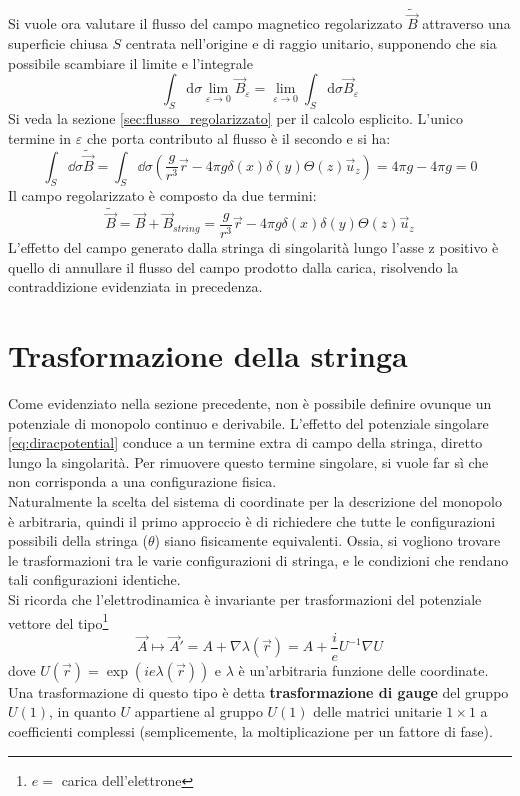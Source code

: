 Si vuole ora valutare il flusso del campo magnetico regolarizzato $\tilde{\vec B}$
attraverso una superficie chiusa $S$ centrata nell'origine e di raggio unitario, supponendo
che sia possibile scambiare il limite e l'integrale
$$
  \int_S \mathrm{d}{\sigma} \lim_{\varepsilon \to 0} \vec B_\varepsilon = \lim_{\varepsilon \to 0} \int_S \mathrm{d}\sigma \vec B_\varepsilon
$$
Si veda la sezione \ref{sec:flusso_regolarizzato} per il calcolo esplicito.
L'unico termine in $\varepsilon$ che porta contributo al flusso è il secondo e si
ha:
$$
   \int_S \dd\sigma \tilde{\vec B}
      = \int_S \dd \sigma \left( \frac{g}{r^3}\vec r
         - 4\pi g \delta(x)\delta(y)\Theta(z) \vec u _z \right)
      = 4\pi g - 4\pi g = 0
$$
%
Il campo regolarizzato è composto da due termini:
$$
   \tilde{\vec B} = \vec B + \vec B _{string} = \frac{g}{r^3}\vec r
      - 4\pi g \delta(x)\delta(y)\Theta(z) \vec u _z
$$
L'effetto del campo generato dalla stringa di singolarità lungo l'asse z positivo
è quello di annullare il flusso del campo prodotto dalla carica, risolvendo la
contraddizione evidenziata in precedenza.


\section{Trasformazione della stringa}\label{sec:gaugestring}
Come evidenziato nella sezione precedente, non è possibile definire ovunque un
potenziale di monopolo continuo e derivabile. L'effetto del potenziale singolare
\ref{eq:diracpotential} conduce a un termine extra di campo della stringa,
diretto lungo la singolarità.
Per rimuovere questo termine singolare, si vuole far sì che non corrisponda a una
configurazione fisica.\\
Naturalmente la scelta del sistema di coordinate per la descrizione del monopolo
è arbitraria, quindi il primo approccio è di richiedere che tutte le configurazioni
possibili della stringa ($\theta$) siano fisicamente equivalenti.
Ossia, si vogliono trovare le trasformazioni tra le varie configurazioni di stringa,
e le condizioni che rendano tali configurazioni identiche.\\

Si ricorda che l'elettrodinamica è invariante per trasformazioni del potenziale
vettore del tipo\footnote{$e =$ carica dell'elettrone}
\begin{equation}
   \vec A \mapsto \vec A' = A + \nabla \lambda (\vec r) = A + \frac{i}{e}
    U^{-1}\nabla U
\end{equation}
dove $U(\vec r) = \exp(ie\lambda(\vec r))$ e $\lambda$ è un'arbitraria funzione
delle coordinate. Una trasformazione di questo tipo è detta
\textbf{trasformazione di gauge}  del gruppo $U(1)$, in quanto $U$ appartiene
  al gruppo $U(1)$ delle matrici unitarie $1 \times 1$ a coefficienti complessi
  (semplicemente, la moltiplicazione per un fattore di fase).\\

